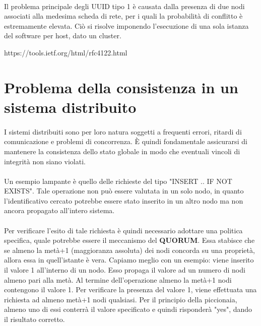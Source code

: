 \documentclass{article}
\begin{document}
\paragraph{} Il problema principale degli UUID tipo 1 è causata dalla presenza di due nodi associati alla medesima scheda di rete, per i quali la probabilità di conflitto è estremamente elevata. Ciò si risolve imponendo l'esecuzione di una sola istanza del software per host, dato un cluster.   


https://tools.ietf.org/html/rfc4122.html


\section{Problema della consistenza in un sistema distribuito}

\paragraph{} I sistemi distribuiti sono per loro natura soggetti a frequenti errori, ritardi di comunicazione e problemi di concorrenza. È quindi fondamentale assicurarsi di mantenere la consistenza dello stato globale in modo che eventuali vincoli di integrità non siano violati. 

\paragraph{} Un esempio lampante è quello delle richieste del tipo "INSERT .. IF NOT EXISTS". Tale operazione non può essere valutata in un solo nodo, in quanto l'identificativo cercato potrebbe essere stato inserito in un altro nodo ma non ancora propagato all'intero sistema. 

\paragraph{} Per verificare l'esito di tale richiesta è quindi necessario adottare una politica specifica, quale potrebbe essere il meccanismo del \textbf{QUORUM}. Essa stabisce che se almeno la metà+1 (maggioranza assoluta) dei nodi concorda su una proprietà, allora essa in quell'istante è vera. Capiamo meglio con un esempio: viene inserito il valore 1 all'interno di un nodo. Esso propaga il valore ad un numero di nodi almeno pari alla metà. Al termine dell'operazione almeno la metà+1 nodi contengono il valore 1. Per verificare la presenza del valore 1, viene effettuata una richiesta ad almeno metà+1 nodi qualsiasi. Per il principio della piccionaia, almeno uno di essi conterrà il valore specificato e quindi risponderà "yes", dando il risultato corretto. 
\end{document}
